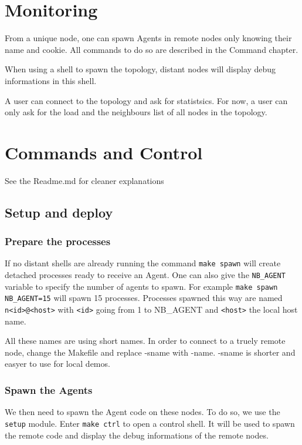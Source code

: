 \documentclass[a4paper,10pt]{report}
\begin{document}
\chapter{Monitoring}
From a unique node, one can spawn Agents in remote nodes only knowing 
their name and cookie. All commands to do so are described in the 
Command chapter.

When using a shell to spawn the topology, distant nodes will display
debug informations in this shell.

A user can connect to the topology and ask for statistsics.
For now, a user can only ask for the load and the neighbours list of 
all nodes in the topology.

\chapter{Commands and Control}
See the Readme.md for cleaner explanations

\section{Setup and deploy}

\subsection{Prepare the processes}
If no distant shells are already running the command \texttt{make spawn}
will create detached processes ready to receive an Agent. One can also
give the \texttt{NB\_AGENT} variable to specify the number of agents to
spawn. For example \texttt{make spawn NB\_AGENT=15} will spawn 15 processes.
Processes spawned this way are named \texttt{n<id>@<host>} with 
\texttt{<id>} going from 1 to NB\_AGENT and \texttt{<host>} the local
host name.

All these names are using short names. In order to connect to a truely
remote node, change the Makefile and replace -sname with -name.
-sname is shorter and easyer to use for local demos.

\subsection{Spawn the Agents}
We then need to spawn the Agent code on these nodes. To do so, we use
the \texttt{setup} module. 
Enter \texttt{make ctrl} to open a control shell. It will be used to 
spawn the remote code and display the debug informations of the 
remote nodes. 
\end{document}
